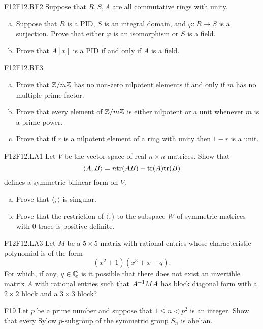 \documentclass[../AlgebraQualSolutions.tex]{subfiles}
\begin{document}
	\begin{prob}{F12}{F12.RF2}
	Suppose that $R,S,A$ are all commutative rings with unity.
	\begin{enumerate}[(a)]
	\item Suppose that $R$ is a PID, $S$ is an integral domain, and $\varphi:R \to S$ is a surjection. Prove that either $\varphi$ is an isomorphism or $S$ is a field.
	\item Prove that $A[x]$ is a PID if and only if $A$ is a field.
	\end{enumerate}
	\end{prob}
	
	\begin{prob}{F12}{F12.RF3}
	\begin{enumerate}[(a)]
	\item Prove that $\mathbb{Z}/m\mathbb{Z}$ has no non-zero nilpotent elements if and only if $m$ has no multiple prime factor.
	\item Prove that every element of $\mathbb{Z}/m\mathbb{Z}$ is either nilpotent or a unit whenever $m$ is a prime power.
	\item Prove that if $r$ is a nilpotent element of a ring with unity then $1-r$ is a unit.
	\end{enumerate}
	\end{prob}
	
	\begin{prob}{F12}{F12.LA1}
	Let $V$ be the vector space of real $n \times n$ matrices. Show that 	
		\[\langle A, B \rangle = n \mathrm{tr}(AB) - \mathrm{tr}(A)\mathrm{tr}(B) \]
	defines a symmetric bilinear form on $V$.
	\begin{enumerate}[(a)]
	\item Prove that $\langle,\rangle$ is singular.
	\item Prove that the restriction of $\langle,\rangle$ to the subspace $W$ of symmetric matrices with 0 trace is positive definite.
	\end{enumerate}
	\end{prob}

	\begin{prob}{F12}{F12.LA3}
	Let $M$ be a $5 \times 5$ matrix with rational entries whose characteristic polynomial is of the form
		\[(x^2+1)(x^3+x+q).\]
	For which, if any, $q \in \mathbb{Q}$ is it possible that there does not exist an invertible matrix $A$ with rational entries such that $A^{-1} M A$ has block diagonal form with a $2 \times 2$ block and a $3 \times 3$ block?
	\end{prob}
	
	\begin{prob}{F19}{}
	Let $p$ be a prime number and suppose that $1 \leq n <p^2$ is an integer. Show that every Sylow $p$-subgroup of the symmetric group $S_n$ is abelian.
	\end{prob}
	
\end{document}
